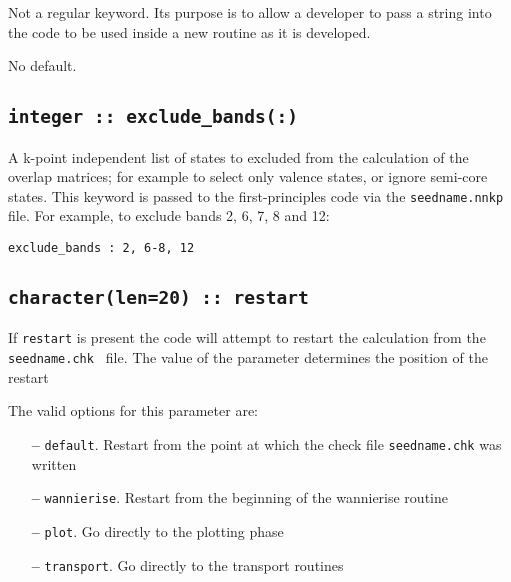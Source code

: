 Not a regular keyword. Its purpose is to allow a developer to pass a
string into the code to be used inside a new routine as it is developed.

No default.

%
%


\subsection[exclude\_bands]{\tt integer :: exclude\_bands(:)}

A k-point independent list of states to excluded from the calculation
 of the overlap matrices; 
 for example to select only valence states, or ignore semi-core states.
 This keyword is passed to the first-principles code via the
 {\tt seedname.nnkp} file. For example, to exclude bands 2, 6, 7, 8
 and 12:

 \verb#exclude_bands : 2, 6-8, 12# 

\subsection[restart]{\tt character(len=20) :: restart}

If \verb#restart# is present the code will attempt to restart the calculation
from the {\tt seedname.chk } file. The value of the parameter
determines the position of the restart

The valid options for this parameter are:
\begin{itemize}
\item[{\bf --}]  \verb#default#. Restart from the point at which the
  check file {\tt seedname.chk} was written  
\item[{\bf --}]  \verb#wannierise#. Restart from the beginning of the
  wannierise routine 
\item[{\bf --}]  \verb#plot#. Go directly to the plotting phase 
\item[{\bf --}]  \verb#transport#. Go directly to the transport routines


\end{itemize}



